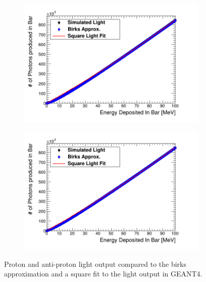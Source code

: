 \begin{figure}[!h]
\centering
\begin{subfigure}{.5\textwidth}
  \centering
  \includegraphics[width=\linewidth]{Chapter4/Figs/protonBirksSlab_simAndApproxLight.png}
  \captionsetup{width=.9\linewidth}
  \caption{}
  \label{subFig:proton_light}
\end{subfigure}%
\begin{subfigure}{.5\textwidth}
  \centering
  \includegraphics[width=\linewidth]{Chapter4/Figs/aProtonBirksSlab_simAndApproxLight.png}
  \captionsetup{width=.9\linewidth}
  \caption{}
  \label{subFig:aproton_light}
\end{subfigure}
\caption{Proton and anti-proton light output compared to the birks approximation and a square fit to the light output in GEANT4.}
\label{fig:proton_aproton_light}
\end{figure}

